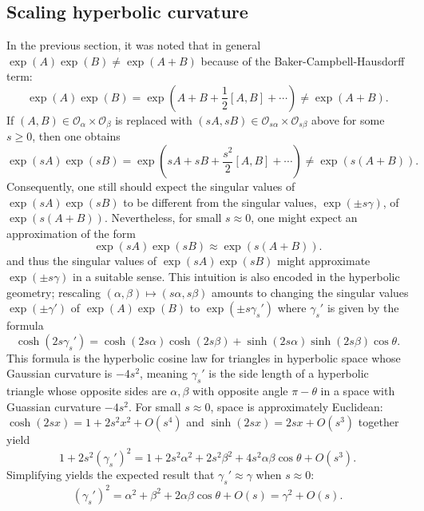 \documentclass[notitlepage, 10pt]{article}
\begin{document}
\subsection{Scaling hyperbolic curvature}

In the previous section, it was noted that in general $\exp(A)\exp(B) \neq \exp(A+B)$ because of the Baker-Campbell-Hausdorff term:
\begin{equation}
    \exp(A)\exp(B) = \exp(A+B+\frac{1}{2}[A,B]+\cdots) \neq \exp(A+B).
\end{equation}
If $(A, B) \in \mathcal O_{\alpha} \times \mathcal O_{\beta}$ is replaced with $(sA, sB) \in \mathcal O_{s\alpha} \times \mathcal O_{s \beta}$ above for some $s \geq 0$, then one obtains
\begin{equation}
    \exp(sA)\exp(sB) = \exp(sA+sB+\frac{s^2}{2}[A,B]+\cdots) \neq \exp(s(A+B)).
\end{equation}
Consequently, one still should expect the singular values of $\exp(sA)\exp(sB)$ to be different from the singular values, $\exp(\pm s \gamma)$, of $\exp(s(A+B))$.
Nevertheless, for small $s \approx 0$, one might expect an approximation of the form
\begin{equation}
    \exp(sA)\exp(sB) \approx \exp(s(A+B)).
\end{equation}
and thus the singular values of $\exp(sA)\exp(sB)$ might approximate $\exp(\pm s \gamma)$ in a suitable sense.
This intuition is also encoded in the hyperbolic geometry; rescaling $(\alpha,\beta)\mapsto (s\alpha, s\beta)$ amounts to changing the singular values $\exp(\pm \gamma')$ of $\exp(A)\exp(B)$ to $\exp(\pm s \gamma_s')$ where $\gamma_s'$ is given by the formula
\begin{equation}
    \cosh(2 s \gamma_s') = \cosh(2 s\alpha) \cosh(2 s\beta) + \sinh (2s\alpha) \sinh (2s\beta)\cos \theta.
\end{equation}
This formula is the hyperbolic cosine law for triangles in hyperbolic space whose Gaussian curvature is $-4s^2$, meaning $\gamma_s'$ is the side length of a hyperbolic triangle whose opposite sides are $\alpha,\beta$ with opposite angle $\pi-\theta$ in a space with Guassian curvature $-4s^2$.
For small $s\approx 0$, space is approximately Euclidean: $\cosh(2sx) = 1 + 2s^2x^2 + O(s^4)$ and $\sinh(2sx) = 2sx + O(s^3)$ together yield 
\begin{equation}
    1 + 2 s^2 (\gamma_s')^2 = 1 + 2 s^2 \alpha^2 + 2 s^2 \beta^2 + 4 s^2 \alpha \beta \cos \theta + O(s^3).
\end{equation}
Simplifying yields the expected result that $\gamma_s' \approx \gamma$ when $s \approx 0$:
\begin{equation}
    (\gamma_s')^2 = \alpha^2 + \beta^2 + 2 \alpha \beta \cos \theta + O(s) = \gamma^2 + O(s).
\end{equation}
\end{document}
